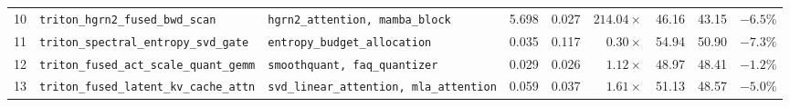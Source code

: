 \begin{table}[t]
\begin{tabular}{rllrrrrrr}
10 & \texttt{triton\_hgrn2\_fused\_bwd\_scan} & \texttt{hgrn2\_attention, mamba\_block} & 5.698 & 0.027 & $\mathbf{214.04\times}$ & 46.16 & 43.15 & $\mathbf{-6.5\%}$ \\
11 & \texttt{triton\_spectral\_entropy\_svd\_gate} & \texttt{entropy\_budget\_allocation} & 0.035 & 0.117 & $0.30\times$ & 54.94 & 50.90 & $\mathbf{-7.3\%}$ \\
12 & \texttt{triton\_fused\_act\_scale\_quant\_gemm} & \texttt{smoothquant, faq\_quantizer} & 0.029 & 0.026 & $\mathbf{1.12\times}$ & 48.97 & 48.41 & $-1.2\%$ \\
13 & \texttt{triton\_fused\_latent\_kv\_cache\_attn} & \texttt{svd\_linear\_attention, mla\_attention} & 0.059 & 0.037 & $\mathbf{1.61\times}$ & 51.13 & 48.57 & $\mathbf{-5.0\%}$ \\
\bottomrule
\end{tabular}
\end{table}
